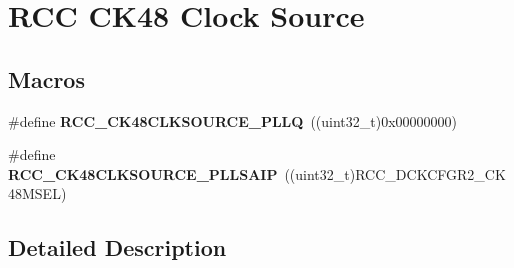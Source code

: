 \hypertarget{group___r_c_c_ex___c_k48___clock___source}{}\section{R\+CC C\+K48 Clock Source}
\label{group___r_c_c_ex___c_k48___clock___source}
\subsection*{Macros}
\begin{DoxyCompactItemize}
\item 
\#define {\bfseries R\+C\+C\+\_\+\+C\+K48\+C\+L\+K\+S\+O\+U\+R\+C\+E\+\_\+\+P\+L\+LQ}~((uint32\+\_\+t)0x00000000)\hypertarget{group___r_c_c_ex___c_k48___clock___source_gaa6fb44c10b1f09d8ab50800d1ab7f4dd}{}\label{group___r_c_c_ex___c_k48___clock___source_gaa6fb44c10b1f09d8ab50800d1ab7f4dd}

\item 
\#define {\bfseries R\+C\+C\+\_\+\+C\+K48\+C\+L\+K\+S\+O\+U\+R\+C\+E\+\_\+\+P\+L\+L\+S\+A\+IP}~((uint32\+\_\+t)R\+C\+C\+\_\+\+D\+C\+K\+C\+F\+G\+R2\+\_\+\+C\+K48\+M\+S\+EL)\hypertarget{group___r_c_c_ex___c_k48___clock___source_ga61428387bb2476bd23229e8dc92570cd}{}\label{group___r_c_c_ex___c_k48___clock___source_ga61428387bb2476bd23229e8dc92570cd}

\end{DoxyCompactItemize}


\subsection{Detailed Description}
